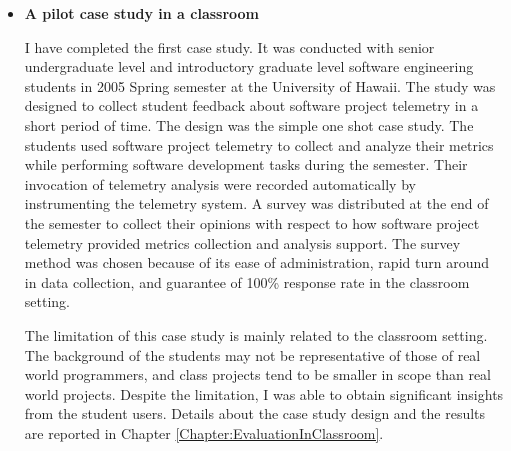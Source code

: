 \begin{itemize}

	\item \textbf{A pilot case study in a classroom}
	  
I have completed the first case study. It was conducted with senior undergraduate level and introductory graduate level software engineering students in 2005 Spring semester at the University of Hawaii. The study was designed to collect student feedback about software project telemetry in a short period of time. The design was the simple one shot case study. The students used software project telemetry to collect and analyze their metrics while performing software development tasks during the semester. Their invocation of telemetry analysis were recorded automatically by instrumenting the telemetry system. A survey was distributed at the end of the semester to collect their opinions with respect to how software project telemetry provided metrics collection and analysis support. The survey method was chosen because of its ease of administration, rapid turn around in data collection, and guarantee of 100\% response rate in the classroom setting. 

The limitation of this case study is mainly related to the classroom setting. The background of the students may not be representative of those of real world programmers, and class projects tend to be smaller in scope than real world projects. %
Despite the limitation, I was able to obtain significant insights from the student users. Details about the case study design and the results are reported in Chapter \ref{Chapter:EvaluationInClassroom}.

	
	 
	 
	 

\end{itemize}
